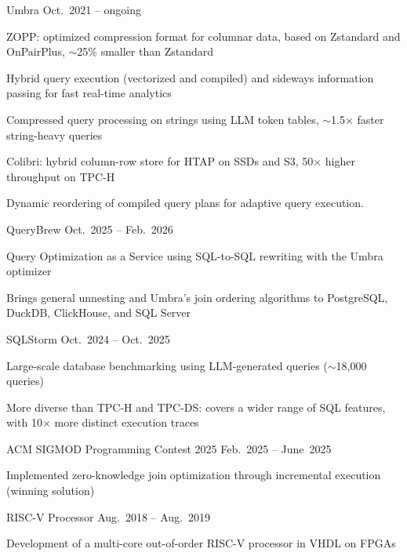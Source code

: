 
\begin{cventries}
    \centry
    {Umbra}
    {}
    {Oct.~2021 -- ongoing}
    {
        \begin{cvitems}
            \item ZOPP: optimized compression format for columnar data, based on Zstandard and OnPairPlus, $\sim$25$\%$ smaller than Zstandard
            \item Hybrid query execution (vectorized and compiled) and sideways information passing for fast real-time analytics
            \item Compressed query processing on strings using LLM token tables, $\sim$1.5$\times$ faster string-heavy queries
            \item Colibri: hybrid column-row store for HTAP on SSDs and S3, 50$\times$ higher throughput on TPC-H
            \item Dynamic reordering of compiled query plans for adaptive query execution.
        \end{cvitems}
    }

    \centry
    {QueryBrew}
    {}
    {Oct.~2025 -- Feb.~2026}
    {
        \begin{cvitems}
            \item Query Optimization as a Service using SQL-to-SQL rewriting with the Umbra optimizer
            \item Brings general unnesting and Umbra's join ordering algorithms to PostgreSQL, DuckDB, ClickHouse, and SQL Server
        \end{cvitems}
    }

    \centry
    {SQLStorm}
    {}
    {Oct.~2024 -- Oct.~2025}
    {
        \begin{cvitems}
            \item Large-scale database benchmarking using LLM-generated queries ($\sim$18,000 queries)
            \item More diverse than TPC-H and TPC-DS: covers a wider range of SQL features, with 10$\times$ more distinct execution traces
        \end{cvitems}
    }

    \centry
    {ACM SIGMOD Programming Contest 2025}
    {}
    {Feb.~2025 -- June~2025}
    {
        \begin{cvitems}
            \item Implemented zero-knowledge join optimization through incremental execution (winning solution)
        \end{cvitems}
    }

    \centry
    {RISC-V Processor}
    {}
    {Aug.~2018 -- Aug.~2019}
    {
        \begin{cvitems}
            \item Development of a multi-core out-of-order RISC-V processor in VHDL on FPGAs
        \end{cvitems}
    }%

\end{cventries}
